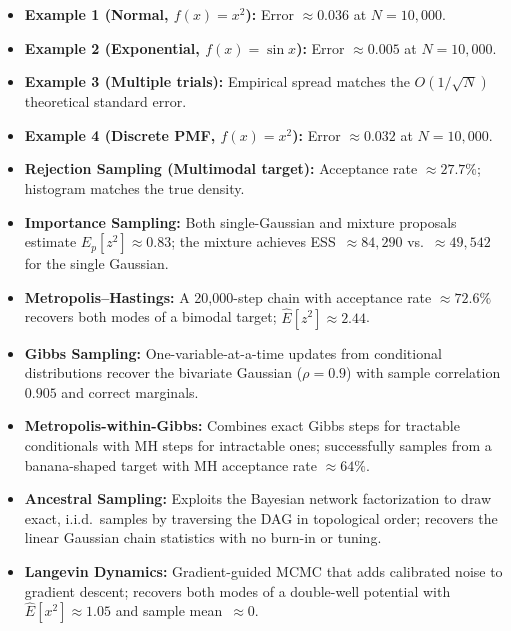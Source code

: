 \documentclass[12pt, a4paper]{article}
\begin{document}
\begin{itemize}
    \item \textbf{Example 1 (Normal, $f(x)=x^2$):} Error $\approx 0.036$
          at $N=10{,}000$.
    \item \textbf{Example 2 (Exponential, $f(x)=\sin x$):} Error
          $\approx 0.005$ at $N=10{,}000$.
    \item \textbf{Example 3 (Multiple trials):} Empirical spread matches
          the $O(1/\sqrt{N})$ theoretical standard error.
    \item \textbf{Example 4 (Discrete PMF, $f(x)=x^2$):} Error
          $\approx 0.032$ at $N=10{,}000$.
    \item \textbf{Rejection Sampling (Multimodal target):} Acceptance
          rate $\approx 27.7\%$; histogram matches the true density.
    \item \textbf{Importance Sampling:} Both single-Gaussian and
          mixture proposals estimate $E_p[z^2] \approx 0.83$; the
          mixture achieves ESS~$\approx 84{,}290$ vs.\
          $\approx 49{,}542$ for the single Gaussian.
    \item \textbf{Metropolis--Hastings:} A 20{,}000-step chain with
          acceptance rate $\approx 72.6\%$ recovers both modes of a
          bimodal target; $\hat{E}[z^2] \approx 2.44$.
    \item \textbf{Gibbs Sampling:} One-variable-at-a-time updates
          from conditional distributions recover the bivariate
          Gaussian ($\rho=0.9$) with sample correlation $0.905$
          and correct marginals.
    \item \textbf{Metropolis-within-Gibbs:} Combines exact Gibbs
          steps for tractable conditionals with MH steps for
          intractable ones; successfully samples from a
          banana-shaped target with MH acceptance rate
          $\approx 64\%$.
    \item \textbf{Ancestral Sampling:} Exploits the Bayesian
          network factorization to draw exact, i.i.d.\ samples
          by traversing the DAG in topological order; recovers
          the linear Gaussian chain statistics with no burn-in
          or tuning.
    \item \textbf{Langevin Dynamics:} Gradient-guided MCMC that
          adds calibrated noise to gradient descent; recovers
          both modes of a double-well potential with
          $\hat{E}[x^2] \approx 1.05$ and sample
          mean~$\approx 0$.
\end{itemize}
\end{document}
